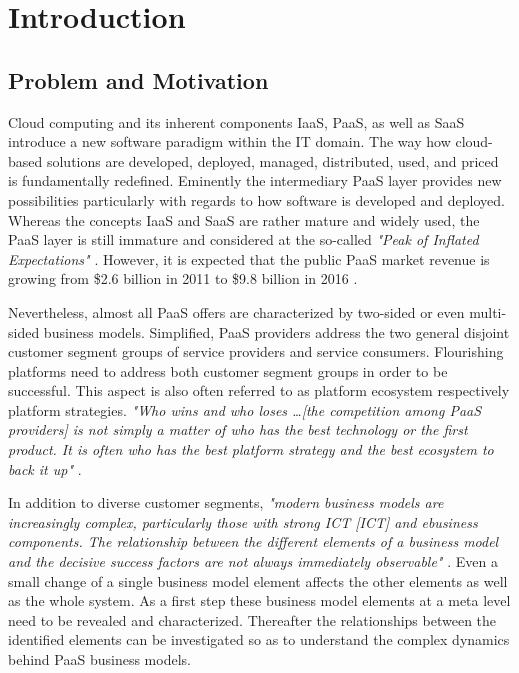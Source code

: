 \chapter{Introduction}\label{ch:intro}

\section{Problem and Motivation}\label{ch:intro:mo}


Cloud computing and its inherent components \acf{IaaS}, \acf{PaaS}, as well as \acf{SaaS} introduce a new software paradigm within the \acf{IT} domain. The way how cloud-based solutions are developed, deployed, managed, distributed, used, and priced is fundamentally redefined. Eminently the intermediary \ac{PaaS} layer provides new possibilities particularly with regards to how software is developed and deployed. Whereas the concepts \ac{IaaS} and \ac{SaaS} are rather mature and widely used, the \ac{PaaS} layer is still immature and considered at the so-called \textit{"Peak of Inflated Expectations"} \citep[p. 5]{Smith2012}. However, it is expected that the public \ac{PaaS} market revenue is growing from \$2.6 billion in 2011 to \$9.8 billion in 2016 \citep[p. 22]{Hendrick2012a}.

Nevertheless, almost all \ac{PaaS} offers are characterized by two-sided or even multi-sided business models. Simplified, \ac{PaaS} providers address the two general disjoint customer segment groups of service providers and service consumers. Flourishing platforms need to address both customer segment groups in order to be successful. This aspect is also often referred to as platform ecosystem respectively platform strategies. \textit{"Who wins and who loses \ldots [the competition among \ac{PaaS} providers] is not simply a matter of who has the best technology or the first product. It is often who has the best platform strategy and the best ecosystem to back it up"} \citep[p. 34]{Cusumano2010}.

In addition to diverse customer segments, \textit{"modern business models are increasingly complex, particularly those with strong ICT [\acl{ICT}] and ebusiness components. The relationship between the different elements of a business model and the decisive success factors are not always immediately observable"} \citep[p. 14]{Osterwalder2005}. Even a small change of a single business model element affects the other elements as well as the whole system. As a first step these business model elements at a meta level need to be revealed and characterized. Thereafter the relationships between the identified elements can be investigated so as to understand the complex dynamics behind \ac{PaaS} business models.

